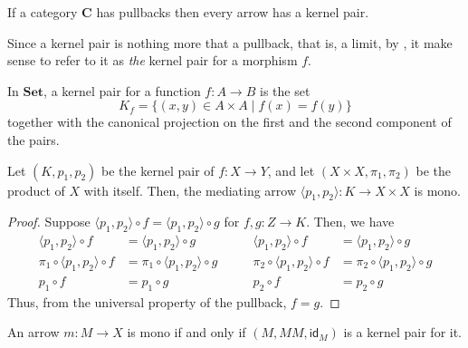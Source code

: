 \documentclass[runningheads,envcountsect]{llncs}
\newcommand{\cat}[1]{\ensuremath{\mathbf{#1}}}
\newcommand{\Set}{\mathbf{Set}}
\newcommand{\id}[1]{\mathsf{id}_{#1}}
\begin{document}
\begin{remark}
	If a category $\cat{C}$ has pullbacks then every arrow has a kernel pair.
\end{remark}

\begin{remark}
    Since a kernel pair is nothing more that a pullback, that is, a limit, by , it make sense to refer to it as \emph{the} kernel pair for a morphism $f$.
\end{remark}

\begin{example}\label{ex:kernel_pairs_in_Set}
    In $\Set$, a kernel pair for a function $f: A\to B$ is the set
    \[
        K_f=\{(x, y) \in A \times A \mid f(x) = f(y)\}
    \]
    together with the canonical projection on the first and the second component of the pairs.
\end{example}

\begin{proposition}\label{prop:pairng_of_kernel_pairs_mono}
    Let $(K, p_1, p_2)$ be the kernel pair of $f: X \to Y$, and let $(X\times X, \pi_1, \pi_2)$ be the product of $X$ with itself. Then, the mediating arrow $\langle p_1, p_2\rangle : K \to X \times X$ is mono.
\end{proposition}

\begin{proof}
	Suppose $\langle p_1, p_2 \rangle \circ f = \langle p_1, p_2 \rangle \circ g$ for $f, g: Z \to K$. Then, we have
	\[
		\begin{split}
			\langle p_1, p_2 \rangle \circ f &=  \langle p_1, p_2 \rangle \circ g \\
			\pi_1 \circ \langle p_1, p_2 \rangle \circ f &=  \pi_1 \circ \langle p_1, p_2 \rangle \circ g \\
			p_1 \circ f &= p_1 \circ g
		\end{split}
		\qquad
		\begin{split}
			\langle p_1, p_2 \rangle \circ f &=  \langle p_1, p_2 \rangle \circ g \\
			\pi_2 \circ \langle p_1, p_2 \rangle \circ f &=  \pi_2 \circ \langle p_1, p_2 \rangle \circ g \\
			p_2 \circ f &= p_2 \circ g
		\end{split}
	\]
	Thus, from the universal property of the pullback, $f = g$.
\end{proof}

\begin{proposition}\label{prop:kermono}
	An arrow $m\colon M\to X$ is mono if and only if $(M, MM, \id{M})$ is a kernel pair for it.
\end{proposition}
\end{document}
